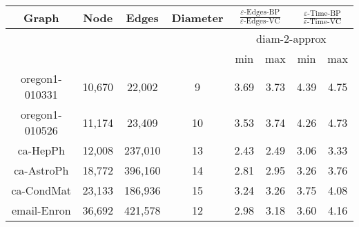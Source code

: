\begin{table*}[ht]
\centering %
  \begin{small}
\begin{tabular}{|c c c c |c c |c  c |} %
\hline\hline %
Graph & Node & Edges & Diameter  & \multicolumn{2}{|c|}{$\frac{\varepsilon\mbox{-Edges-BP}}{ \varepsilon\mbox{-Edges-VC}}$} & \multicolumn{2}{c|}{$\frac{\varepsilon\mbox{-Time-BP}}{\varepsilon\mbox{-Time-VC}}$}\\ [0.5ex] %
\hline
&  &  & &\multicolumn{4}{|c|}{diam-2-approx} \\
\hline
&  &  & & min & max & min & max\\
\hline %
oregon1-010331 & 10,670 & 22,002 & 9 & 3.69 & 3.73 & 4.39 & 4.75\\  %
oregon1-010526 & 11,174 & 23,409 & 10 &  3.53 & 3.74 & 4.26 & 4.73 \\
ca-HepPh & 12,008 & 237,010 & 13  & 2.43 & 2.49 & 3.06 & 3.33\\
ca-AstroPh & 18,772 & 396,160  & 14  & 2.81 & 2.95 & 3.26 & 3.76\\
ca-CondMat & 23,133 & 186,936 & 15  & 3.24 & 3.26 & 3.75 & 4.08\\
email-Enron & 36,692 & 421,578 & 12  & 2.98 & 3.18 & 3.60 & 4.16\\[1ex] %
\hline %
\end{tabular}
\end{small}
\caption{\XXX
}
\label{tab:expUndir} %
\end{table*}

